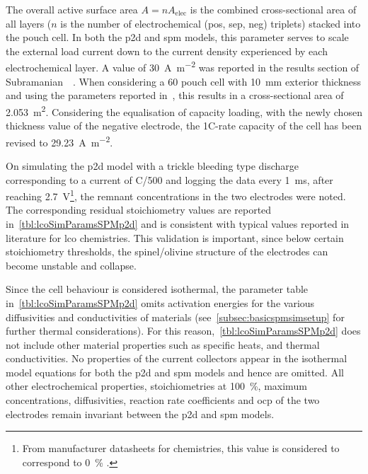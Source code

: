 The  overall  active  surface  area  $A  =  n  A_\text{elec}$  is  the  combined
cross-sectional area of  all layers ($n$ is the number  of electrochemical (pos,
sep,  neg)  triplets)  stacked  into  the pouch  cell.  In  both  the  \gls{p2d}
and  \gls{spm}  models,  this  parameter  serves  to  scale  the  external  load
current  down  to  the  current  density  experienced  by  each  electrochemical
layer. A value of  \approx\SI{30}{\ampere\per\meter\squared} was reported in the
results section of  Subramanian~\etal{}~\cite{Subramanian2009}. When considering
a  \SI{60}{\amphour} pouch  cell with  \SI{10}{\milli\meter} exterior  thickness
and  using  the  parameters  reported  in~\cite{Subramanian2009},  this  results
in  a cross-sectional  area of  \SI{2.053}{\meter\squared}.  Considering  the
equalisation of capacity  loading, with the newly chosen thickness  value of the
negative  electrode, the  1C-rate  capacity  of the  cell  has  been revised  to
\SI{29.23}{\ampere\per\meter\squared}.

On  simulating  the \gls{p2d}  model  with  a  trickle bleeding  type  discharge
corresponding   to   a  current   of   C/500   and   logging  the   data   every
\SI{1}{\milli\second}, after reaching \SI{2.7}{\volt}\footnote{From manufacturer
datasheets  for   chemistries,  this value  is considered  to
correspond to \SI{0}{\percent} .}, the remnant concentrations
in  the two  electrodes  were noted.  The  corresponding residual  stoichiometry
values  are reported  in~\cref{tbl:lcoSimParamsSPMp2d}  and  is consistent  with
typical values reported in literature for \gls{lco} chemistries.  This validation is  important, since below  certain stoichiometry
thresholds, the spinel/olivine  structure of the electrodes  can become unstable
and collapse.

Since   the   cell   behaviour   is   considered   isothermal,   the   parameter
table     in~\cref{tbl:lcoSimParamsSPMp2d}     omits     activation     energies
for    the   various    diffusivities    and    conductivities   of    materials
(see~\cref{subsec:basicspmsimsetup}  for  further thermal  considerations).  For
this  reason,~\cref{tbl:lcoSimParamsSPMp2d}  does  not  include  other  material
properties such  as specific  heats, and  thermal conductivities.  No properties
of  the  current  collectors  appear  in  the  isothermal  model  equations  for
both  the \gls{p2d}  and  \gls{spm}  models and  hence  are  omitted. All  other
electrochemical  properties,   \viz{}  stoichiometries   at  \SI{100}{\percent},
maximum concentrations, diffusivities, reaction  rate coefficients and \gls{ocp}
of  the two  electrodes remain  invariant  between the  \gls{p2d} and  \gls{spm}
models. \nopagebreak[4]

